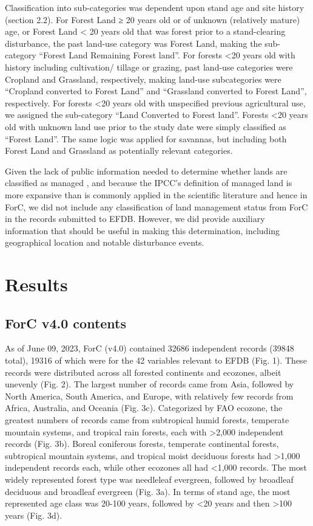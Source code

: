 \documentclass[, manuscript]{copernicus}
\begin{document}
Classification into sub-categories was dependent upon stand age and site
history (section 2.2). For Forest Land ≥ 20 years old or of unknown
(relatively mature) age, or Forest Land \textless{} 20 years old that
was forest prior to a stand-clearing disturbance, the past land-use
category was Forest Land, making the sub-category ``Forest Land
Remaining Forest land''. For forests \textless20 years old with history
including cultivation/ tillage or grazing, past land-use categories were
Cropland and Grassland, respectively, making land-use subcategories were
``Cropland converted to Forest Land'' and ``Grassland converted to
Forest Land'', respectively. For forests \textless20 years old with
unspecified previous agricultural use, we assigned the sub-category
``Land Converted to Forest land''. Forests \textless20 years old with
unknown land use prior to the study date were simply classified as
``Forest Land''. The same logic was applied for savannas, but including
both Forest Land and Grassland as potentially relevant categories.

Given the lack of public information needed to determine whether lands
are classified as managed
\citep{ogle_delineating_2018, deng_comparing_2021}, and because the
IPCC's definition of managed land is more expansive than is commonly
applied in the scientific literature and hence in ForC, we did not
include any classification of land management status from ForC in the
records submitted to EFDB. However, we did provide auxiliary information
that should be useful in making this determination, including
geographical location and notable disturbance events.

\section{Results}

\subsection{ForC v4.0 contents}

As of June 09, 2023, ForC (v4.0) contained 32686 independent records
(39848 total), 19316 of which were for the 42 variables relevant to EFDB
(Fig. 1). These records were distributed across all forested continents
and ecozones, albeit unevenly (Fig. 2). The largest number of records
came from Asia, followed by North America, South America, and Europe,
with relatively few records from Africa, Australia, and Oceania (Fig.
3c). Categorized by FAO ecozone, the greatest numbers of records came
from subtropical humid forests, temperate mountain systems, and tropical
rain forests, each with \textgreater2,000 independent records (Fig. 3b).
Boreal coniferous forests, temperate continental forests, subtropical
mountain systems, and tropical moist deciduous forests had
\textgreater1,000 independent records each, while other ecozones all had
\textless1,000 records. The most widely represented forest type was
needleleaf evergreen, followed by broadleaf deciduous and broadleaf
evergreen (Fig. 3a). In terms of stand age, the most represented age
class was 20-100 years, followed by \textless20 years and then
\textgreater100 years (Fig. 3d).
\end{document}
